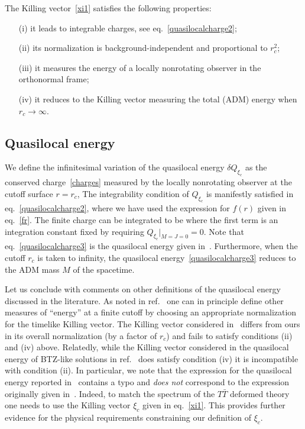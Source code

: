 \documentclass[11pt,a4paper,utf8]{article}
\begin{document}
	The Killing vector~\eqref{xi1} satisfies the following properties:
	 \begin{enumerate}[nosep]
	 \item[(i)] it leads to integrable charges, see eq.~\eqref{quasilocalcharge2};
	 \item[(ii)] its normalization is background-independent and proportional to $r_c^2$;
	 \item[(iii)] it measures the energy of a locally nonrotating observer in the orthonormal frame;
	 \item[(iv)] it reduces to the Killing vector measuring the total (ADM) energy when $r_c \to \infty$.
	 \end{enumerate}
	
\subsection{Quasilocal energy}
	
	We define the infinitesimal variation of the quasilocal energy $\delta Q_{\xi_c}$ as the conserved charge~\eqref{charges} measured by the locally nonrotating observer at the cutoff surface $r = r_c$, 
	The integrability condition of $Q_{\xi_c}$ is manifestly satisfied in eq.~\eqref{quasilocalcharge2}, where we have used the expression for $f(r)$ given in eq.~\eqref{fr}. The finite charge can be integrated to be 
	where the first term is an integration constant fixed by requiring $Q_{\xi_c}\big |_{M=J=0}=0$.  Note that eq.~\eqref{quasilocalcharge3} is the quasilocal energy given in~\cite{McGough:2016lol}. Furthermore, when the cutoff $r_c$ is taken to infinity, the quasilocal energy~\eqref{quasilocalcharge3} reduces to the ADM mass $M$ of the spacetime. 
	 
	\noindent Let us conclude with comments on other definitions of the quasilocal energy discussed in the literature. As noted in ref.~\cite{Brown:1994gs} one can in principle define other measures of ``energy'' at a finite cutoff by choosing an appropriate normalization for the timelike Killing vector. The Killing vector considered in~\cite{Brown:1994gs} differs from ours in its overall normalization (by a factor of $r_c$) and fails to satisfy conditions (ii) and (iv) above. Relatedly, while the Killing vector considered in the quasilocal energy of BTZ-like solutions in ref.~\cite{Giribet:2013yka} does satisfy condition (iv) it is incompatible with condition (ii). In particular, we note that the expression for the quasilocal energy reported in~\cite{McGough:2016lol} contains a typo and \emph{does not} correspond to the expression originally given in~\cite{Brown:1994gs}. Indeed, to match the spectrum of the $T\bar{T}$ deformed theory one needs to use the Killing vector $\xi_c$ given in eq.~\eqref{xi1}. This provides further evidence for the physical requirements constraining our definition of $\xi_c$.  
\end{document}
